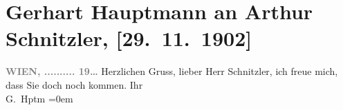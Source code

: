

         \renewcommand{\erwaehnteOrte}{Orte: Hotel Sacher, Wien}
         \renewcommand{\erwaehnteWerke}{}
               \section[Gerhart Hauptmann an Arthur Schnitzler, {[}29. 11. 1902{]}]{ Gerhart Hauptmann an Arthur Schnitzler, {[}29. 11. 1902{]}}\nopagebreak{}\rehead{ }\begin{ledgroupsized}[t]{13cm}\normalsize\beginnumbering \toendnotes[C]{\smallbreak\pagebreak[2]} 
\toendnotes[C]{\smallbreak}\pstart
           \noindent{}{\pb}\textcolor{gray}{\textbf{\label{T_L01253-1v}\label{T_L01253-1h}}}\hfill \textcolor{gray}{\textbf{WIEN, .......... 19{\dots}}}\pend
           \pstart
           Herzlichen Gruss, lieber Herr Schnitzler, ich freue mich, dass Sie
               doch noch kommen.\pend
           \pstart
           Ihr{\\[\baselineskip]}\spacefill\mbox{G. Hptm}\pend
           \leftskip=0em{}
         
         \endnumbering{}\end{ledgroupsized}  \newcommand{\dateiname}{L01253}\newcommand{\titel}{Gerhart Hauptmann an Arthur Schnitzler, [29. 11. 1902]}\newcommand{\editorInnen}{Martin Anton Müller und Gerd-Hermann Susen}
      